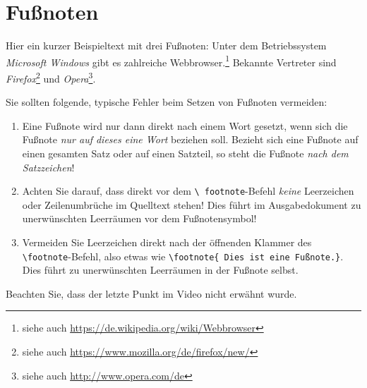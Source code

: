 \documentclass[12pt,a4paper]{scrartcl}
\begin{document}
%
\section{Fußnoten}
Hier ein kurzer Beispieltext mit drei Fußnoten: Unter dem
Betriebssystem \textit{Microsoft Windows} gibt es zahlreiche
Webbrowser.\footnote{siehe auch
  \url{https://de.wikipedia.org/wiki/Webbrowser}} Bekannte Vertreter
sind \textit{Firefox}\footnote{siehe auch
  \url{https://www.mozilla.org/de/firefox/new/}} und
\textit{Opera}\footnote{siehe auch \url{http://www.opera.com/de}}.

Sie sollten folgende, typische Fehler beim Setzen von Fußnoten
vermeiden:
%
\begin{enumerate}
  \item Eine Fußnote wird nur dann direkt nach einem Wort gesetzt, wenn
    sich die Fußnote \emph{nur auf dieses eine Wort} beziehen soll.
    Bezieht sich eine Fußnote auf einen gesamten Satz oder auf einen
    Satzteil, so steht die Fußnote \emph{nach dem Satzzeichen}!
  \item Achten Sie darauf, dass direkt vor dem \texttt{\textbackslash
    footnote}-Befehl \emph{keine} Leerzeichen oder Zeilenumbrüche im
    Quelltext stehen! Dies führt im Ausgabedokument zu unerwünschten
    Leerräumen vor dem Fußnotensymbol!
  \item Vermeiden Sie Leerzeichen direkt nach der öffnenden Klammer
    des \texttt{\textbackslash footnote}-Befehl, also etwas wie
    \texttt{\textbackslash footnote\{ Dies ist eine Fußnote.\}}. Dies
    führt zu unerwünschten Leerräumen in der Fußnote selbst.
\end{enumerate}
Beachten Sie, dass der letzte Punkt im Video nicht erwähnt wurde.
\end{document}
